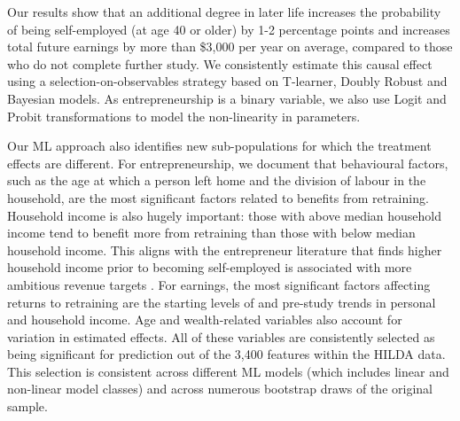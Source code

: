 \documentclass[12pt, a4paper]{article}
\begin{document}
Our results show that an additional degree in later life increases the probability of being self-employed (at age 40 or older) by 1-2 percentage points and increases total future earnings by more than \$3,000 per year on average, compared to those who do not complete further study. We consistently estimate this causal effect using a selection-on-observables strategy based on T-learner, Doubly Robust and Bayesian models. As entrepreneurship is a binary variable, we also use Logit and Probit transformations to model the non-linearity in parameters. 

Our ML approach also identifies new sub-populations for which the treatment effects are different. For entrepreneurship, we document that behavioural factors, such as the age at which a person left home and the division of labour in the household, are the most significant factors related to benefits from retraining. Household income is also hugely important: those with above median household income tend to benefit more from retraining than those with below median household income. This aligns with the entrepreneur literature that finds higher household income prior to becoming self-employed is associated with more ambitious revenue targets \citep{cassar2006}. For earnings, the most significant factors affecting returns to retraining are the starting levels of and pre-study trends in personal and household income. Age and wealth-related variables also account for variation in estimated effects. All of these variables are consistently selected as being significant for prediction out of the 3,400 features within the HILDA data. This selection is consistent across different ML models (which includes linear and non-linear model classes) and across numerous bootstrap draws of the original sample. 
\end{document}
